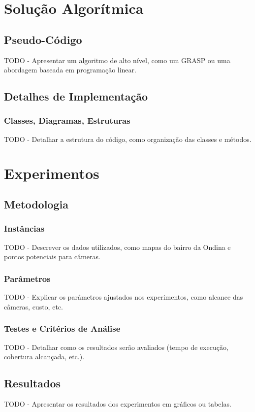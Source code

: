 \documentclass[12pt, a4paper]{report}
\begin{document}
\chapter{Solução Algorítmica}

\section{Pseudo-Código}
TODO - Apresentar um algoritmo de alto nível, como um GRASP ou uma abordagem baseada em programação linear.

\section{Detalhes de Implementação}
\subsection{Classes, Diagramas, Estruturas}
TODO - Detalhar a estrutura do código, como organização das classes e métodos.

\chapter{Experimentos}

\section{Metodologia}
\subsection{Instâncias}
TODO - Descrever os dados utilizados, como mapas do bairro da Ondina e pontos potenciais para câmeras.

\subsection{Parâmetros}
TODO - Explicar os parâmetros ajustados nos experimentos, como alcance das câmeras, custo, etc.

\subsection{Testes e Critérios de Análise}
TODO - Detalhar como os resultados serão avaliados (tempo de execução, cobertura alcançada, etc.).

\section{Resultados}
TODO - Apresentar os resultados dos experimentos em gráficos ou tabelas.
\end{document}
